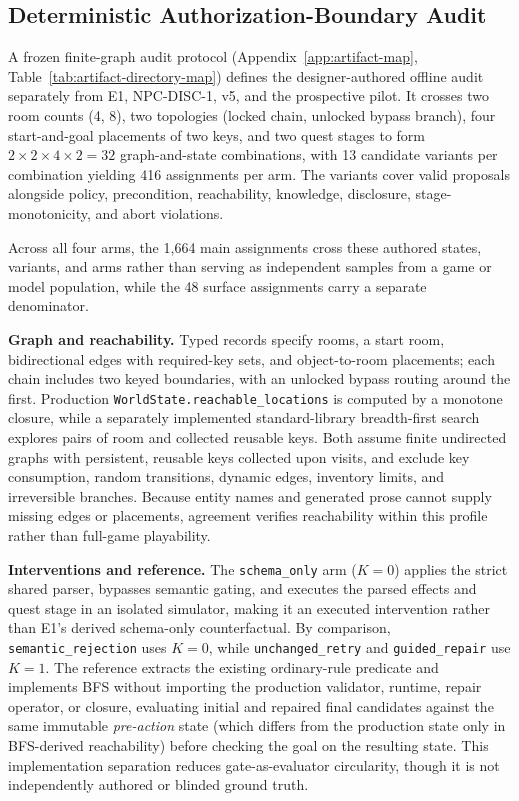 \documentclass[journal]{IEEEtran}
\begin{document}
\subsection{Deterministic Authorization-Boundary Audit}\label{sec:review-boundary-audit}
A frozen finite-graph audit protocol (Appendix~\ref{app:artifact-map}, Table~\ref{tab:artifact-directory-map}) defines the designer-authored offline audit separately from E1, NPC-DISC-1, v5, and the prospective pilot. It crosses two room counts (4, 8), two topologies (locked chain, unlocked bypass branch), four start-and-goal placements of two keys, and two quest stages to form $2\times2\times4\times2=32$ graph-and-state combinations, with 13 candidate variants per combination yielding 416 assignments per arm. The variants cover valid proposals alongside policy, precondition, reachability, knowledge, disclosure, stage-monotonicity, and abort violations.

Across all four arms, the 1,664 main assignments cross these authored states, variants, and arms rather than serving as independent samples from a game or model population, while the 48 surface assignments carry a separate denominator.

\textbf{Graph and reachability.} Typed records specify rooms, a start room, bidirectional edges with required-key sets, and object-to-room placements; each chain includes two keyed boundaries, with an unlocked bypass routing around the first. Production \texttt{WorldState.reachable\_locations} is computed by a monotone closure, while a separately implemented standard-library breadth-first search explores pairs of room and collected reusable keys. Both assume finite undirected graphs with persistent, reusable keys collected upon visits, and exclude key consumption, random transitions, dynamic edges, inventory limits, and irreversible branches. Because entity names and generated prose cannot supply missing edges or placements, agreement verifies reachability within this profile rather than full-game playability.

\textbf{Interventions and reference.} The \texttt{schema\_only} arm ($K{=}0$) applies the strict shared parser, bypasses semantic gating, and executes the parsed effects and quest stage in an isolated simulator, making it an executed intervention rather than E1's derived schema-only counterfactual. By comparison, \texttt{semantic\_rejection} uses $K{=}0$, while \texttt{unchanged\_retry} and \texttt{guided\_repair} use $K{=}1$. The reference extracts the existing ordinary-rule predicate and implements BFS without importing the production validator, runtime, repair operator, or closure, evaluating initial and repaired final candidates against the same immutable \emph{pre-action} state (which differs from the production state only in BFS-derived reachability) before checking the goal on the resulting state. This implementation separation reduces gate-as-evaluator circularity, though it is not independently authored or blinded ground truth.
\end{document}
